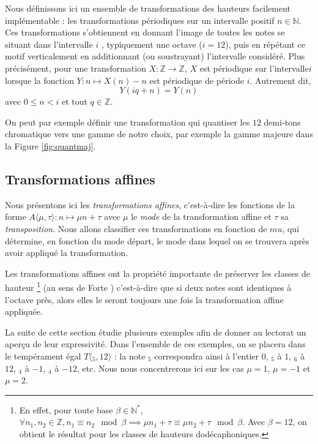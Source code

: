 \documentclass{article}
\begin{document}
Nous définissons ici un ensemble de transformations des hauteurs facilement implémentable : les transformations périodiques sur un intervalle positif $n\in \mathbb{N}$. Ces transformations s'obtiennent en donnant l'image de toutes les notes se situant dans l'intervalle $i$ , typiquement une octave ($i = 12$), puis en répétant ce motif verticalement en additionnant (ou soustrayant) l'intervalle considéré. Plus précisément, pour une transformation $X : \mathbb{Z} \rightarrow \mathbb{Z}$, $X$ est périodique sur l'intervalle$i$ lorsque la fonction $Y : n \mapsto X(n) - n$ est périodique de période $i$. Autrement dit, $$Y(iq + n) = Y(n)$$
\noindent avec  $0 \leq n < i$ et tout $q\in \mathbb{Z}$.

On peut par exemple définir une transformation qui quantiser les $12$ demi-tons chromatique vers une gamme de notre choix, par exemple la gamme majeure dans la Figure \ref{fig:quantmaj}.

\subsection{Transformations affines}

Nous présentons ici les \emph{transformations affines}, c'est-à-dire les fonctions de la forme $A\langle\mu,\tau\rangle : n \mapsto \mu n + \tau$ avec $\mu$ le \emph{mode} de la transformation affine et $\tau$ sa \emph{transposition}. Nous allons classifier ces transformations en fonction de $mu$, qui détermine, en fonction du mode départ, le mode dans lequel on se trouvera après avoir appliqué la transformation.

Les transformations affines ont la propriété importante de préserver les classes de hauteur \footnote{En effet, pour toute base $\beta\in \mathbb{N}^*$, $\forall n_1,n_2 \in \mathbb{Z}, n_1 \equiv n_2 \mod \beta \implies \mu n_1 + \tau \equiv \mu n_2 + \tau \mod \beta$. Avec $\beta=12$, on obtient le résultat pour les classes de hauteurs dodécaphoniques. }  (au sens de Forte \cite{forte1973structure}) c'est-à-dire que si deux notes sont identiques à l'octave près, alors elles le seront toujours une fois la transformation affine appliquée.

La suite de cette section étudie plusieurs exemples afin de donner au lectorat un aperçu de leur expressivité. Dans l'ensemble de ces exemples, on se placera dans le tempérament égal $T\langle $$_5,12\rangle$ : la note $_5$ correspondra ainsi à l'entier $0$, $_5$ à $1$, $_6$ à $12$, $_4$ à $-1$, $_4$ à $-12$, etc. Nous nous concentrerons ici sur les cas $\mu = 1$, $\mu = -1$ et $\mu = 2$.
\end{document}
